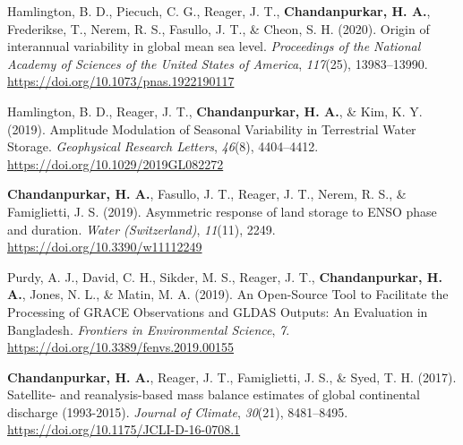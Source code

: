\documentclass[10pt]{article}
\begin{document}
\label{csl:0}Hamlington, B. D., Piecuch, C. G., Reager, J. T., \textbf{Chandanpurkar, H. A.}, Frederikse, T., Nerem, R. S., Fasullo, J. T., \& Cheon, S. H. (2020). {Origin of interannual variability in global mean sea level}. \textit{Proceedings of the National Academy of Sciences of the United States of America}, \textit{117}(25), 13983–13990. \url{https://doi.org/10.1073/pnas.1922190117}

\label{csl:0}Hamlington, B. D., Reager, J. T., \textbf{Chandanpurkar, H. A.}, \& Kim, K. Y. (2019). {Amplitude Modulation of Seasonal Variability in Terrestrial Water Storage}. \textit{Geophysical Research Letters}, \textit{46}(8), 4404–4412. \url{https://doi.org/10.1029/2019GL082272}

\label{csl:0}\textbf{Chandanpurkar, H. A.}, Fasullo, J. T., Reager, J. T., Nerem, R. S., \& Famiglietti, J. S. (2019). {Asymmetric response of land storage to ENSO phase and duration}. \textit{Water (Switzerland)}, \textit{11}(11), 2249. \url{https://doi.org/10.3390/w11112249}

\label{csl:0}Purdy, A. J., David, C. H., Sikder, M. S., Reager, J. T., \textbf{Chandanpurkar, H. A.}, Jones, N. L., \& Matin, M. A. (2019). {An Open-Source Tool to Facilitate the Processing of GRACE Observations and GLDAS Outputs: An Evaluation in Bangladesh}. \textit{Frontiers in Environmental Science}, \textit{7}. \url{https://doi.org/10.3389/fenvs.2019.00155}

\label{csl:0}\textbf{Chandanpurkar, H. A.}, Reager, J. T., Famiglietti, J. S., \& Syed, T. H. (2017). {Satellite- and reanalysis-based mass balance estimates of global continental discharge (1993-2015)}. \textit{Journal of Climate}, \textit{30}(21), 8481–8495. \url{https://doi.org/10.1175/JCLI-D-16-0708.1}
\end{document}
